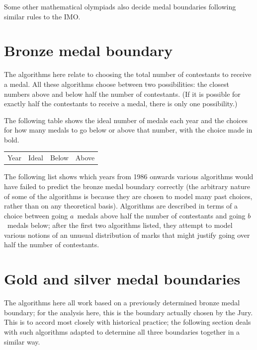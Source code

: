 \documentclass[a4paper,10pt]{article}
\begin{document}
Some other mathematical olympiads also decide medal boundaries
following similar rules to the IMO.

\section*{Bronze medal boundary}

The algorithms here relate to choosing the total number of contestants
to receive a medal.  All these algorithms choose between two
possibilities: the closest numbers above and below half the number of
contestants.  (If it is possible for exactly half the contestants to
receive a medal, there is only one possibility.)

The following table shows the ideal number of medals each year and the
choices for how many medals to go below or above that number, with the
choice made in bold.

\begin{tabular}{cccc}
Year & Ideal & Below & Above \\

\end{tabular}

The following list shows which years from 1986 onwards
various algorithms would have failed to predict the
bronze medal boundary correctly (the arbitrary nature of some of the
algorithms is because they are chosen to model many past choices,
rather than on any theoretical basis).  Algorithms are described in
terms of a choice between going $a$~medals above half the number of
contestants and going $b$~medals below; after the first two algorithms
listed, they attempt to model various notions of an unusual
distribution of marks that might justify going over half the number of
contestants.

\begin{itemize}

\end{itemize}

\section*{Gold and silver medal boundaries}

The algorithms here all work based on a previously determined bronze
medal boundary; for the analysis here, this is the boundary actually
chosen by the Jury.  This is to accord most closely with historical
practice; the following section deals with such algorithms adapted to
determine all three boundaries together in a similar way.
\end{document}
